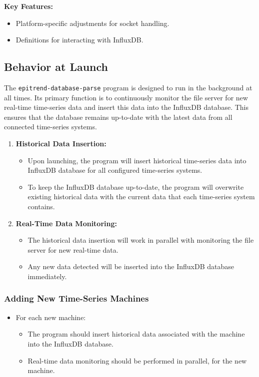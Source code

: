 \documentclass{article}
\begin{document}
\vspace{5pt}
\noindent
\textbf{Key Features:}
\begin{itemize}
    \item Platform-specific adjustments for socket handling.
    \item Definitions for interacting with InfluxDB.
\end{itemize}


\subsection{Behavior at Launch}
The \texttt{epitrend-database-parse} program is designed to run in the background at all times. Its primary function is to continuously monitor the file server for new real-time time-series data and insert this data into the InfluxDB database. This ensures that the database remains up-to-date with the latest data from all connected time-series systems.

\vspace{10pt}
\noindent
\begin{enumerate}
    \item \textbf{Historical Data Insertion:}
    \begin{itemize}
        \item Upon launching, the program will insert historical time-series data into InfluxDB database for all configured time-series systems.
        \item To keep the InfluxDB database up-to-date, the program will overwrite existing historical data with the current data that each time-series system contains.
    \end{itemize}
    
    \item \textbf{Real-Time Data Monitoring:}
    \begin{itemize}
        \item The historical data insertion will work in parallel with monitoring the file server for new real-time data.
        \item Any new data detected will be inserted into the InfluxDB database immediately.
    \end{itemize}
\end{enumerate}

\subsubsection*{Adding New Time-Series Machines}
\begin{itemize}
    \item For each new machine:
    \begin{itemize}
        \item The program should insert historical data associated with the machine into the InfluxDB database.
        \item Real-time data monitoring should be performed in parallel, for the new machine.
    \end{itemize}
\end{itemize}
\end{document}
